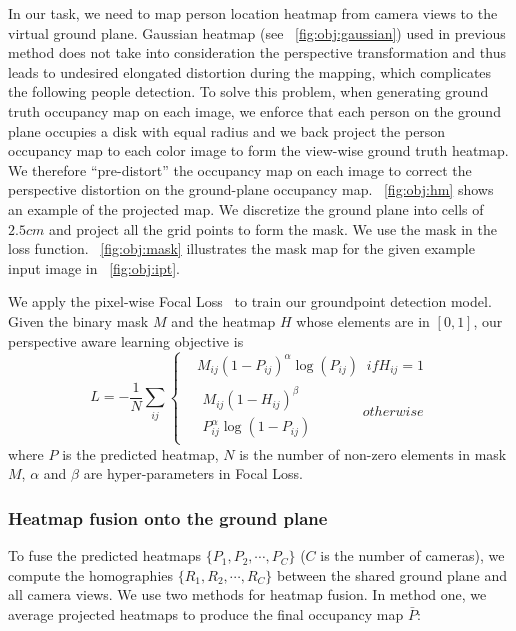 \documentclass{article}
\begin{document}
In our task, we need to map person location heatmap from camera views to the virtual
ground plane. Gaussian heatmap (see \figurename{~\ref{fig:obj:gaussian}}) used in previous method does not take into consideration the
perspective transformation and thus
leads to undesired elongated distortion during the mapping, which complicates
the following people detection. To solve this problem,
when generating ground truth occupancy map on each image, we enforce that each person on the ground plane occupies a disk with equal radius and we
back project the person occupancy map to each color image to form the view-wise ground truth heatmap.
We therefore ``pre-distort'' the occupancy map on each image to correct the perspective distortion
on the ground-plane occupancy map.
\figurename{~\ref{fig:obj:hm}} shows an example of the projected map. 
We discretize the ground plane into cells of $2.5 cm$ and project all the grid points to form the mask. 
We use the mask in the loss function.
\figurename{~\ref{fig:obj:mask}} illustrates the mask map for the given example input image in \figurename{~\ref{fig:obj:ipt}}.

We apply the pixel-wise Focal Loss~\cite{law2018cornernet} to train our groundpoint
detection model. Given the  binary mask $M$ and the heatmap $H$ whose elements are in $[0,1]$, our perspective aware learning objective is
\begin{equation}
L = -\frac{1}{N} \sum_{ij} \left\{
\begin{split} & M_{ij}(1-P_{ij})^\alpha \log(P_{ij}) \;\; \mathit{if} H_{ij} = 1\\
&\begin{split}M_{ij}(1-H_{ij})^\beta \\ P_{ij} ^\alpha \log(1-P_{ij})\end{split}  \qquad \quad \;\mathit{otherwise}
\end{split}
\right.
\label{eqn:loss}
\end{equation}
where $P$ is the predicted heatmap, $N$ is  the number of non-zero elements in mask $M$, $\alpha$ and $\beta$ are hyper-parameters in Focal Loss.

\subsubsection{Heatmap fusion onto the ground plane}
To fuse the predicted heatmaps $\{P_1, P_2, \cdots, P_C\}$ ($C$ is the number of cameras), we compute the homographies $\{R_1, R_2, \cdots, R_C\}$ between the shared ground plane and all camera views. We use two methods for heatmap fusion. 
In method one, we average projected heatmaps to produce the final occupancy map $\bar{P}$:
\end{document}
